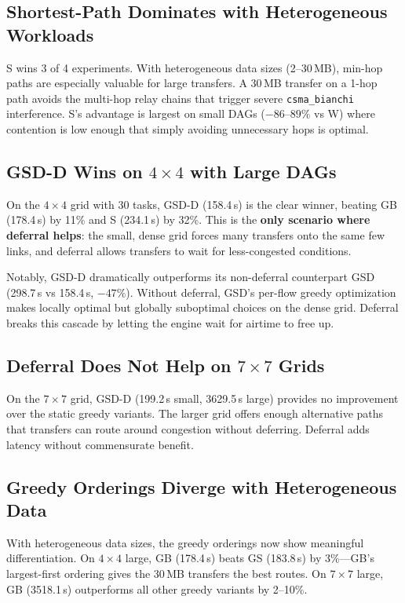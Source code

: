 \documentclass[11pt]{article}
\begin{document}
\subsection{Shortest-Path Dominates with Heterogeneous Workloads}

S wins 3 of 4 experiments.  With heterogeneous data sizes (2--30\,MB),
min-hop paths are especially valuable for large transfers.  A 30\,MB
transfer on a 1-hop path avoids the multi-hop relay chains that trigger
severe \texttt{csma\_bianchi} interference.  S's advantage is largest on
small DAGs ($-86$--$89\%$ vs W) where contention is low enough that simply
avoiding unnecessary hops is optimal.

\subsection{GSD-D Wins on $4\times4$ with Large DAGs}

On the $4\times4$ grid with 30 tasks, GSD-D (158.4\,s) is the clear winner,
beating GB (178.4\,s) by 11\% and S (234.1\,s) by 32\%.  This is the
\textbf{only scenario where deferral helps}: the small, dense grid forces
many transfers onto the same few links, and deferral allows transfers to
wait for less-congested conditions.

Notably, GSD-D dramatically outperforms its non-deferral counterpart GSD
(298.7\,s vs 158.4\,s, $-47\%$).  Without deferral, GSD's per-flow greedy
optimization makes locally optimal but globally suboptimal choices on the
dense grid.  Deferral breaks this cascade by letting the engine wait for
airtime to free up.

\subsection{Deferral Does Not Help on $7\times7$ Grids}

On the $7\times7$ grid, GSD-D (199.2\,s small, 3629.5\,s large) provides no
improvement over the static greedy variants.  The larger grid offers enough
alternative paths that transfers can route around congestion without
deferring.  Deferral adds latency without commensurate benefit.

\subsection{Greedy Orderings Diverge with Heterogeneous Data}

With heterogeneous data sizes, the greedy orderings now show meaningful
differentiation.  On $4\times4$ large, GB (178.4\,s) beats GS (183.8\,s) by
3\%---GB's largest-first ordering gives the 30\,MB transfers the best
routes.  On $7\times7$ large, GB (3518.1\,s) outperforms all other greedy
variants by 2--10\%.
\end{document}
